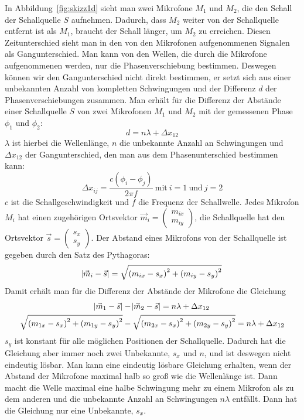 In Abbildung~\ref{fig:skizz1d} sieht man zwei Mikrofone $M_1$ und $M_2$, die den Schall der Schallquelle $S$ aufnehmen. Dadurch, dass $M_2$ weiter von der Schallquelle entfernt ist als $M_1$, braucht der Schall länger, um $M_2$ zu erreichen. Diesen Zeitunterschied sieht man in den von den Mikrofonen aufgenommenen Signalen als Gangunterschied. Man kann von den Wellen, die durch die Mikrofone aufgenommenen werden, nur die Phasenverschiebung bestimmen. Deswegen können wir den Gangunterschied nicht direkt bestimmen, er setzt sich aus einer unbekannten Anzahl von kompletten Schwingungen und der Differenz $d$ der Phasenverschiebungen zusammen. Man erhält für die Differenz der Abstände einer Schallquelle $S$ von zwei Mikrofonen $M_1$ und $M_2$ mit der gemessenen Phase $\phi_1$ und $\phi_2$: $$d = n\lambda + \Delta{x_{12}}$$ $\lambda$ ist hierbei die Wellenlänge, $n$ die unbekannte Anzahl an Schwingungen und $\Delta{x_{12}}$ der Gangunterschied, den man aus dem Phasenunterschied bestimmen kann:
\begin{equation}
\Delta{x_{ij}} = \frac{c(\phi_i - \phi_j)}{{2\pi}f}\:\textrm{mit}\:i = 1\:\textrm{und}\:j = 2
\end{equation}
$c$ ist die Schallgeschwindigkeit und $f$ die Frequenz der Schallwelle.
Jedes Mikrofon $M_i$ hat einen zugehörigen Ortsvektor $\vec{m}_i = \begin{pmatrix} m_{ix} \\ m_{iy}  \end{pmatrix}$, die Schallquelle hat den Ortsvektor $\vec{s} = \begin{pmatrix} {s_x} \\ {s_y}  \end{pmatrix}$. Der Abstand eines Mikrofons von der Schallquelle ist gegeben durch den Satz des Pythagoras:
\begin{equation}
\abs{\vec{m}_i - \vec{s}} = \sqrt{{(m_{ix} - s_x)}^2 + {(m_{iy} - s_y)}^2}
\end{equation}
Damit erhält man für die Differenz der Abstände der Mikrofone die Gleichung
\begin{gather}
\abs{\vec{m}_1 - \vec{s}} - \abs{\vec{m}_2 - \vec{s}} = n\lambda + \Delta{x_{12}}\\
\sqrt{{(m_{1x} - s_x)}^2 + {(m_{1y} - s_y)}^2} - \sqrt{{(m_{2x} - s_x)}^2 + {(m_{2y} - s_y)}^2} = n\lambda + \Delta{x_{12}}
\end{gather}
$s_y$ ist konstant für alle möglichen Positionen der Schallquelle. Dadurch hat die Gleichung aber immer noch zwei Unbekannte, $s_x$ und $n$, und ist deswegen nicht eindeutig lösbar. Man kann eine eindeutig lösbare Gleichung erhalten, wenn der Abstand der Mikrofone maximal halb so groß wie die Wellenlänge ist. Dann macht die Welle maximal eine halbe Schwingung mehr zu einem Mikrofon als zu dem anderen und die unbekannte Anzahl an Schwingungen $n\lambda$ entfällt. Dann hat die Gleichung nur eine Unbekannte, $s_x$.
